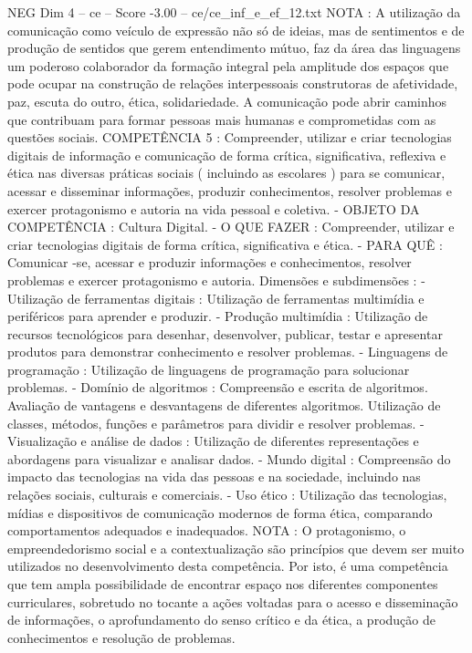 \begin{textsample}{NEG Dim 4 – ce – Score -3.00 – ce/ce\_inf\_e\_ef\_12.txt}
NOTA : A utilização da comunicação como veículo de expressão não só de ideias, mas de sentimentos e de produção de sentidos que gerem entendimento mútuo, faz da área das linguagens um poderoso colaborador da formação integral pela amplitude dos espaços que pode ocupar na construção de relações interpessoais construtoras de afetividade, paz, escuta do outro, ética, solidariedade.
A comunicação pode abrir caminhos que contribuam para formar pessoas mais humanas e comprometidas com as questões sociais.
COMPETÊNCIA 5 : Compreender, utilizar e criar tecnologias digitais de informação e comunicação de forma crítica, significativa, reflexiva e ética nas diversas práticas sociais ( incluindo as escolares ) para se comunicar, acessar e disseminar informações, produzir conhecimentos, resolver problemas e exercer protagonismo e autoria na vida pessoal e coletiva. - OBJETO DA COMPETÊNCIA : Cultura Digital. - O QUE FAZER : Compreender, utilizar e criar tecnologias digitais de forma crítica, significativa e ética. - PARA QUÊ : Comunicar -se, acessar e produzir informações e conhecimentos, resolver problemas e exercer protagonismo e autoria.
Dimensões e subdimensões : - Utilização de ferramentas digitais : Utilização de ferramentas multimídia e periféricos para aprender e produzir. - Produção multimídia : Utilização de recursos tecnológicos para desenhar, desenvolver, publicar, testar e apresentar produtos para demonstrar conhecimento e resolver problemas. - Linguagens de programação : Utilização de linguagens de programação para solucionar problemas. - Domínio de algoritmos : Compreensão e escrita de algoritmos.
Avaliação de vantagens e desvantagens de diferentes algoritmos.
Utilização de classes, métodos, funções e parâmetros para dividir e resolver problemas. - Visualização e análise de dados : Utilização de diferentes representações e abordagens para visualizar e analisar dados. - Mundo digital : Compreensão do impacto das tecnologias na vida das pessoas e na sociedade, incluindo nas relações sociais, culturais e comerciais. - Uso ético : Utilização das tecnologias, mídias e dispositivos de comunicação modernos de forma ética, comparando comportamentos adequados e inadequados.
NOTA : O protagonismo, o empreendedorismo social e a contextualização são princípios que devem ser muito utilizados no desenvolvimento desta competência.
Por isto, é uma competência que tem ampla possibilidade de encontrar espaço nos diferentes componentes curriculares, sobretudo no tocante a ações voltadas para o acesso e disseminação de informações, o aprofundamento do senso crítico e da ética, a produção de conhecimentos e resolução de problemas.

\end{textsample}
